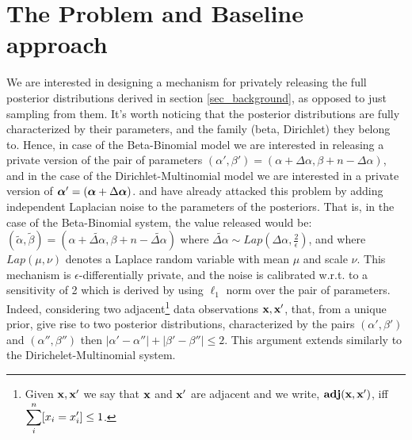 \documentclass[sigconf]{acmart}
\begin{document}
\section{The Problem and Baseline approach}
\label{sec:base}
We are interested in designing a mechanism for privately releasing the full posterior
distributions derived in section \ref{sec_background}, as opposed to just sampling from them.
It's worth noticing that the posterior distributions are fully characterized
by their parameters, and the family (beta, Dirichlet) they belong to. Hence, in case of the
Beta-Binomial model we are interested in releasing a private version of the pair of
parameters $(\alpha',\beta')=(\alpha + \Delta \alpha,\beta + n - \Delta \alpha)$, and
in the case of the Dirichlet-Multinomial model we are interested in a private version of
$\boldsymbol{\alpha}'=(\boldsymbol{\alpha} + \Delta \boldsymbol{\alpha})$. \citet{zhang2016differential} and \citet{xiao2012bayesian}
have already attacked this problem by adding independent Laplacian noise to the
parameters of the posteriors. That is, in the case of the Beta-Binomial system,
the value released would  be: $(\tilde\alpha,\tilde\beta)=(\alpha +  \widetilde{\Delta \alpha},\beta + n - \widetilde{\Delta \alpha})$
where $\widetilde{\Delta \alpha}\sim Lap(\Delta \alpha, \frac{2}{\epsilon})$,
and where $Lap(\mu,\nu)$ denotes a Laplace random variable with mean $\mu$ and scale $\nu$.
This mechanism is $\epsilon$-differentially private, and the noise is
calibrated w.r.t. to a sensitivity of 2 which is derived by using
$\ell_1$ norm over the pair of parameters. Indeed, considering two
adjacent\footnote{Given $\textbf{x}, \textbf{x}'$  we say that $\textbf{x}$ and $\textbf{x}'$ are adjacent and we write, $\textbf{adj}(\textbf{x},\textbf{x}')$, iff\\
$\displaystyle \sum_{i}^{n}[x_i = x'_i ]\leq 1$. } data observations
$\textbf{x}, \textbf{x}'$, that, from a unique prior, give rise to two posterior
distributions, characterized by the pairs
$(\alpha',\beta')$ and $(\alpha'',\beta'')$ then
$|\alpha'-\alpha''|+|\beta'-\beta''|\leq 2$.
This argument extends similarly to the Dirichelet-Multinomial system.
\end{document}
